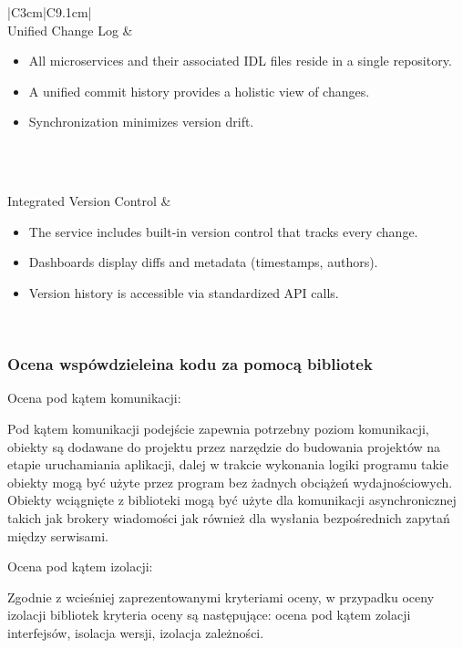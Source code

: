 \documentclass[runningheads,12pt]{llncs}
\begin{document}
\begin{longtable}{|C{3cm}|C{9.1cm}|}
     \\ \hline
    Unified Change Log &
    \begin{itemize}
      \item All microservices and their associated IDL files reside in a single repository.
      \item A unified commit history provides a holistic view of changes.
      \item Synchronization minimizes version drift.
    \end{itemize} \\ \hline

     \\ \hline
    Integrated Version Control &
    \begin{itemize}
      \item The service includes built-in version control that tracks every change.
      \item Dashboards display diffs and metadata (timestamps, authors).
      \item Version history is accessible via standardized API calls.
    \end{itemize} \\ \hline

\end{longtable}

\subsubsection{Ocena wspówdzieleina kodu za pomocą bibliotek}

Ocena pod kątem komunikacji:

Pod kątem komunikacji podejście zapewnia potrzebny poziom komunikacji, obiekty są dodawane do projektu przez narzędzie do budowania projektów na etapie uruchamiania aplikacji, dalej w trakcie wykonania logiki programu takie obiekty mogą być użyte przez program bez żadnych obciążeń wydajnościowych. Obiekty wciągnięte z biblioteki mogą być użyte dla komunikacji asynchronicznej takich jak brokery wiadomości jak również dla wysłania bezpośrednich zapytań między serwisami.

Ocena pod kątem izolacji:

Zgodnie z wcieśniej zaprezentowanymi kryteriami oceny, w przypadku oceny izolacji bibliotek kryteria oceny są następujące: ocena pod kątem zolacji interfejsów, isolacja wersji, izolacja zależności.
\end{document}

